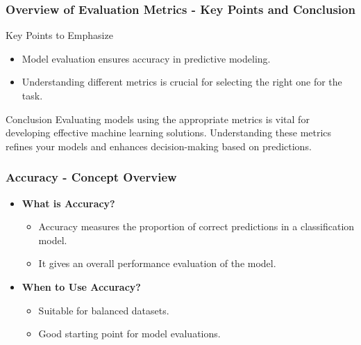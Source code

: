 \documentclass[aspectratio=169]{beamer}
\begin{document}
\begin{frame}[fragile]
    \frametitle{Overview of Evaluation Metrics - Key Points and Conclusion}
    \begin{block}{Key Points to Emphasize}
        \begin{itemize}
            \item Model evaluation ensures accuracy in predictive modeling.
            \item Understanding different metrics is crucial for selecting the right one for the task.
        \end{itemize}
    \end{block}
    
    \begin{block}{Conclusion}
        Evaluating models using the appropriate metrics is vital for developing effective machine learning solutions. 
        Understanding these metrics refines your models and enhances decision-making based on predictions.
    \end{block}
\end{frame}

\begin{frame}[fragile]
    \frametitle{Accuracy - Concept Overview}
    \begin{itemize}
        \item \textbf{What is Accuracy?}
        \begin{itemize}
            \item Accuracy measures the proportion of correct predictions in a classification model.
            \item It gives an overall performance evaluation of the model.
        \end{itemize}
        \item \textbf{When to Use Accuracy?}
        \begin{itemize}
            \item Suitable for balanced datasets.
            \item Good starting point for model evaluations.
        \end{itemize}
    \end{itemize}
\end{frame}
\end{document}
